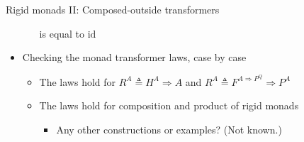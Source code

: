 \documentclass[english]{beamer}
\begin{document}
\begin{frame}{Rigid monads II: Composed-outside transformers}
\begin{itemize}
\begin{itemize}
is equal to $\text{id}$
\end{itemize}
\item Checking the monad transformer laws, case by case
\begin{itemize}
\item The laws hold for $R^{A}\triangleq H^{A}\Rightarrow A$ and $R^{A}\triangleq F^{A\Rightarrow P^{Q}}\Rightarrow P^{A}$
\item The laws hold for composition and product of rigid monads
\begin{itemize}
\item Any other constructions or examples? (Not known.)
\end{itemize}
\end{itemize}
\end{itemize}
\end{frame}
\end{document}
